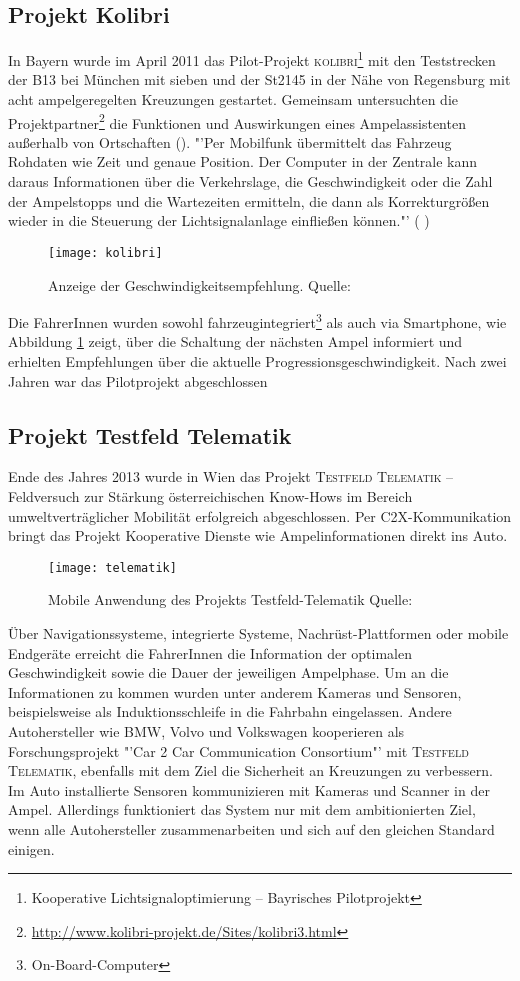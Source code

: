 \subsection*{Projekt Kolibri}
In Bayern wurde im April 2011 das Pilot-Projekt \textsc{kolibri}\footnote{ Kooperative Lichtsignaloptimierung -- Bayrisches Pilotprojekt} mit den Teststrecken der B13 bei München mit sieben und der St2145 in der Nähe von Regensburg mit acht ampelgeregelten Kreuzungen gestartet. Gemeinsam untersuchten die Projektpartner\footnote{ \url{http://www.kolibri-projekt.de/Sites/kolibri3.html}} die Funktionen und Auswirkungen eines Ampelassistenten außerhalb von Ortschaften (\cite{kolibri}). "'Per Mobilfunk übermittelt das Fahrzeug Rohdaten wie Zeit und genaue Position. Der Computer in der Zentrale kann daraus Informationen über die Verkehrslage, die Geschwindigkeit oder die Zahl der Ampelstopps und die Wartezeiten ermitteln, die dann als Korrekturgrößen wieder in die Steuerung der Lichtsignalanlage einfließen können."' (\cite{kolibriTUM} ) 
\begin{figure}[H]  
    \centering  
    \texttt{[image: kolibri]}      
    \caption[Projekt Kolibri]{Anzeige der Geschwindigkeitsempfehlung. Quelle: \cite{kolibri}}
    \label{fig:kolibri}
\end{figure}
Die FahrerInnen wurden sowohl fahrzeugintegriert\footnote{ On-Board-Computer} als auch via Smartphone, wie Abbildung \ref{fig:kolibri} zeigt, über die Schaltung der nächsten Ampel informiert und erhielten Empfehlungen über die aktuelle Progressionsgeschwindigkeit. Nach zwei Jahren war das Pilotprojekt abgeschlossen 
\subsection*{Projekt Testfeld Telematik}
Ende des Jahres 2013 wurde in Wien das Projekt \textsc{Testfeld Telematik} -- Feldversuch zur Stärkung österreichischen Know-Hows im Bereich umweltverträglicher Mobilität erfolgreich abgeschlossen. Per \gls{C2X}-Kommunikation bringt das Projekt Kooperative Dienste wie Ampelinformationen direkt ins Auto. 
\begin{figure}[H]
    \centering
    \texttt{[image: telematik]} \label{fig:telematik}
    \caption[Projekt Testfeld-Telematik Ampelinformation]{Mobile Anwendung des Projekts Testfeld-Telematik Quelle: \cite{Telematik}}
\end{figure} 
Über Navigationssysteme, integrierte Systeme, Nachrüst-Plattformen oder mobile Endgeräte erreicht die FahrerInnen die Information der optimalen Geschwindigkeit sowie die Dauer der jeweiligen Ampelphase\cite{Telematik}. Um an die Informationen zu kommen wurden unter anderem Kameras und Sensoren, beispielsweise als Induktionsschleife in die Fahrbahn eingelassen. Andere Autohersteller wie \gls{BMW}, Volvo und Volkswagen kooperieren als Forschungsprojekt "'Car 2 Car Communication Consortium"' mit \textsc{Testfeld Telematik}, ebenfalls mit dem Ziel die Sicherheit an Kreuzungen zu verbessern. Im Auto installierte Sensoren kommunizieren mit Kameras und Scanner in der Ampel. Allerdings funktioniert das System nur mit dem ambitionierten Ziel, wenn alle Autohersteller zusammenarbeiten und sich auf den gleichen Standard einigen. \cite{Siemens}
